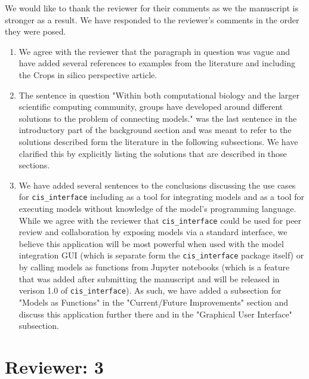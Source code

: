 \documentclass[11pt]{article}
\newcommand{\pkg}{{\tt cis\_interface}{}}
\begin{document}
We would like to thank the reviewer for their comments as we the manuscript is stronger as a result. We have responded to the reviewer's comments in the order they were posed.
\begin{enumerate}
\item We agree with the reviewer that the paragraph in question was vague and have added several references to examples from the literature and including the Crops in silico perspective article.
\item The sentence in question "Within both computational biology and the larger scientific computing community, groups have developed around different solutions to the problem of connecting models." was the last sentence in the introductory part of the background section and was meant to refer to the solutions described form the literature in the following subsections. We have clarified this by explicitly listing the solutions that are described in those sections.
\item We have added several sentences to the conclusions discussing the use cases for {\pkg} including as a tool for integrating models and as a tool for executing models without knowledge of the model's programming language. While we agree with the reviewer that {\pkg} could be used for peer review and collaboration by exposing models via a standard interface, we believe this application will be most powerful when used with the model integration GUI (which is separate form the {\pkg} package itself) or by calling models as functions from Jupyter notebooks (which is a feature that was added after submitting the manuscript and will be released in verison 1.0 of {\pkg}). As such, we have added a subsection for "Models as Functions" in the "Current/Future Improvements" section and discuss this application further there and in the "Graphical User Interface" subsection.
\end{enumerate}

\section{Reviewer: 3}
\end{document}

